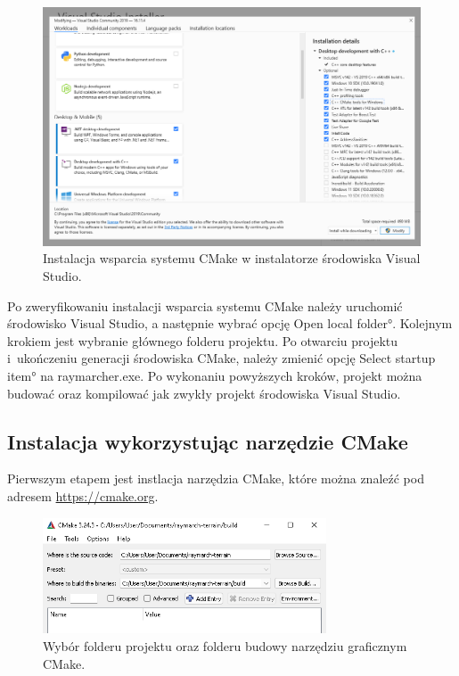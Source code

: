 \begin{figure}
\centering
\includegraphics[width=1\textwidth]{./graf/vscmakeinstall.png}
\caption{Instalacja wsparcia systemu CMake w instalatorze środowiska Visual Studio.}
\label{fig:vs-cmake-install}
\end{figure}

Po zweryfikowaniu instalacji wsparcia systemu CMake należy uruchomić środowisko Visual Studio, a następnie wybrać opcję \ang{Open local folder}. Kolejnym krokiem jest wybranie głównego folderu projektu. Po otwarciu projektu i~ukończeniu generacji środowiska CMake, należy zmienić opcję \ang{Select startup item} na raymarcher.exe. Po wykonaniu powyższych kroków, projekt można budować oraz kompilować jak zwykły projekt środowiska Visual Studio.

\subsection{Instalacja wykorzystując narzędzie CMake}
Pierwszym etapem jest instlacja narzędzia CMake, które można znaleźć pod adresem \url{https://cmake.org}.

\begin{figure}
\centering
\includegraphics[width=0.75\textwidth]{./graf/cmake-win.png}
\caption{Wybór folderu projektu oraz folderu budowy narzędziu graficznym CMake.}
\label{fig:cmake-win}
\end{figure}

